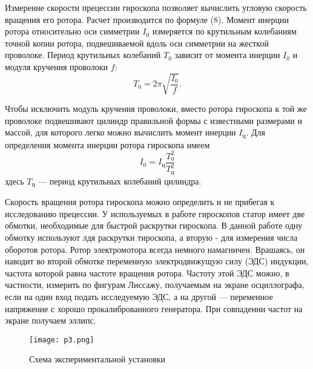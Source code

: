 Измерение скорости прецессии гироскопа позволяет вычислить угловую
скорость вращения его ротора. Расчет производится по формуле (8).
Момент инерции ротора относительно оси симметрии $I_0$ измеряется
по крутильным колебаниям точной копии ротора, подвешиваемой вдоль
оси симметрии на жесткой проволоке. Период крутильных колебаний $T_0$
зависит от момента инерции $I_0$ и модуля кручения проволоки $f$:
\begin{equation}
    T_0 = 2\pi\sqrt{\frac{I_0}{f}}.
\end{equation}

Чтобы исключить модуль кручения проволоки, вместо ротора гироскопа
к той же проволоке подвешивают цилиндр правильной формы с
известными размерами и массой, для которого легко можно вычислить
момент инерции $I_{\text{ц}}$. Для определения момента инерции
ротора гироскопа имеем
\begin{equation}
    I_0 = I_\text{ц}\frac{T_0^2}{T_\text{ц}^2}
\end{equation}
здесь $T_\text{ц}$ — период крутильных колебаний цилиндра.

Скорость вращения ротора гироскопа можно определить и не прибегая
к исследованию прецессии. У используемых в работе гироскопов статор
имеет две обмотки, необходимые для быстрой раскрутки гироскопа.
В данной работе одну обмотку используют лдя раскрутки тироскопа,
а вторую - для измерения числа оборотов ротора. Ротор электромотора
всегда немного намагничен. Врашаясь, он наводит во второй обмотке
переменную электродвижущую силу (ЭДС) индукции, частота которой
равна частоте вращения ротора. Частоту этой ЭДС можно, в частности,
измерить по фигурам Лиссажу, получаемым на экране осциллографа,
если на один вход подать исследуемую ЭДС, а на другой — переменное
напряжение с хорошо прокалиброванного генератора. При совпадении
частот на экране получаем эллипс.
\begin{figure}[H]
    \centering
\texttt{[image: p3.png]}
    \caption{Схема экспериментальной установки}
    \label{fig:my_label}
\end{figure}
